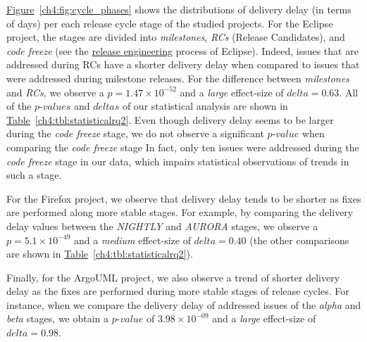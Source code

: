 \noindent\DIFdelbegin \textit{\textbf{}%
}
\DIFdelend \DIFaddbegin {}
\DIFaddend \hyperref[ch4:fig:cycle_phases]{Figure}~\ref{ch4:fig:cycle_phases} shows the
distributions of delivery delay (in terms of days) per each release cycle stage
of the studied projects. For the Eclipse project, the stages are divided into
{\em milestones}, {\em RCs} (Release Candidates), and {\em code freeze} (see the
\hyperref[eclipse:releng]{release engineering} process of Eclipse). Indeed,
issues that are addressed during RCs have a shorter delivery delay when compared
to issues that were addressed during milestone releases. For the difference
between {\em milestones} and {\em RCs}, we observe a $p=1.47 \times 10^{-52}$
and a {\em large} effect-size of $delta=0.63$. All of the $p$-$values$ and
$deltas$ of our statistical analysis are shown in
\hyperref[ch4:tbl:statisticalrq2]{Table}~\ref{ch4:tbl:statisticalrq2}. Even
though delivery delay seems to be larger during the {\em code freeze} stage, we
do not observe a significant $p$-$value$ when comparing the {\em code freeze}
stage \DIFdelbegin {}\DIFdelend \DIFaddbegin {}    \DIFaddend In fact, only
ten issues were addressed during the {\em code freeze} stage in our data, which
impairs statistical observations of trends in such a stage.

For the Firefox project, we observe that delivery delay tends to be
shorter as fixes are performed along more stable stages. For example, by
comparing the delivery delay values between the {\em NIGHTLY} and {\em
AURORA} stages, we observe a $p=5.1 \times 10^{-49}$ and a {\em medium}
effect-size of $delta = 0.40$ (the other comparisons are shown in
\hyperref[ch4:tbl:statisticalrq2]{Table}~\ref{ch4:tbl:statisticalrq2}).

Finally, for the ArgoUML project, we also observe a trend of shorter
delivery delay as the fixes are performed during more stable stages of release
cycles. For instance, when we compare the delivery delay of addressed issues of the {\em alpha}
and {\em beta} stages, we obtain a $p$-$value$ of $3.98 \times 10^{-09}$ and a {\em
large} effect-size of $delta = 0.98$.\\

